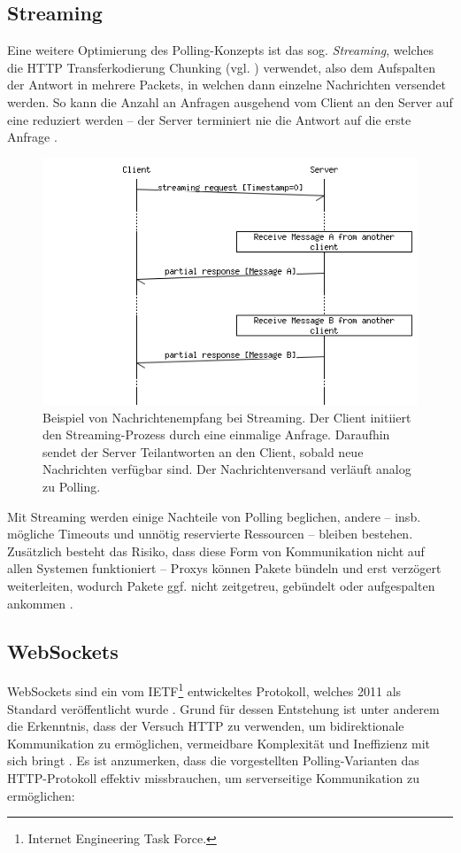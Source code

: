 \documentclass[sigplan, screen]{acmart}
\begin{document}
\subsection{Streaming}

Eine weitere Optimierung des Polling-Konzepts ist das sog. \emph{Streaming},
welches die HTTP Transferkodierung Chunking (vgl. \cite[Abs. 7.1]{fielding_http_2022}) verwendet,
also dem Aufspalten der Antwort in mehrere Packets, in welchen dann einzelne Nachrichten versendet werden.
So kann die Anzahl an Anfragen ausgehend vom Client an den Server auf eine reduziert werden --
der Server terminiert nie die Antwort auf die erste Anfrage \cite[Abs. 3]{saint-andre_known_2011}.

\begin{figure}[H]
  \centering
  \includegraphics[width=.45\textwidth]{assets/msc/streaming.png}
  \caption[Nachrichtenempfang bei Streaming]{Beispiel von Nachrichtenempfang bei Streaming.
    Der Client initiiert den Streaming-Prozess durch eine einmalige Anfrage.
    Daraufhin sendet der Server Teilantworten an den Client, sobald neue Nachrichten verfügbar sind.
    Der Nachrichtenversand verläuft analog zu Polling.}
  \label{fig:streaming}
\end{figure}

Mit Streaming werden einige Nachteile von Polling beglichen, andere -- insb. mögliche Timeouts und unnötig reservierte Ressourcen -- bleiben bestehen.
Zusätzlich besteht das Risiko, dass diese Form von Kommunikation nicht auf allen Systemen funktioniert --
Proxys können Pakete bündeln und erst verzögert weiterleiten, wodurch Pakete ggf. nicht zeitgetreu, gebündelt oder aufgespalten ankommen \cite[Abs. 3.2]{saint-andre_known_2011}.

\subsection{WebSockets}

WebSockets sind ein vom IETF\footnote{Internet Engineering Task Force.} entwickeltes Protokoll,
welches 2011 als Standard veröffentlicht wurde \cite{melnikov_websocket_2011}.
Grund für dessen Entstehung ist unter anderem die Erkenntnis, dass der Versuch HTTP zu verwenden,
um bidirektionale Kommunikation zu ermöglichen, vermeidbare Komplexität und Ineffizienz mit sich bringt \cite[S. 137f]{lubbers_pro_2010}.
Es ist anzumerken, dass die vorgestellten Polling-Varianten das HTTP-Protokoll effektiv missbrauchen,
um serverseitige Kommunikation zu ermöglichen:
\end{document}
